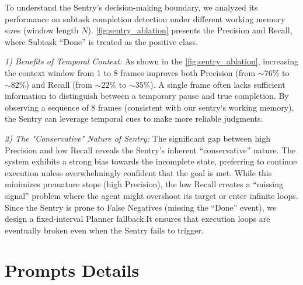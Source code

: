 To understand the Sentry's decision-making boundary, we analyzed its performance on subtask completion detection under different working memory sizes (window length $N$). \autoref{fig:sentry_ablation} presents the Precision and Recall, where Subtask ``Done'' is treated as the positive class.

\textit{1) Benefits of Temporal Context:}
As shown in the \autoref{fig:sentry_ablation}, increasing the context window from 1 to 8 frames improves both Precision (from $\sim76\%$ to $\sim82\%$) and Recall (from $\sim22\%$ to $\sim35\%$).
A single frame often lacks sufficient information to distinguish between a temporary pause and true completion.
By observing a sequence of 8 frames (consistent with our sentry‘s working memory), the Sentry can leverage temporal cues to make more reliable judgments.

\textit{2) The "Conservative" Nature of Sentry:}
The significant gap between high Precision and low Recall reveals the Sentry's inherent ``conservative'' nature.
The system exhibits a strong bias towards the incomplete state, preferring to continue execution unless overwhelmingly confident that the goal is met.
While this minimizes premature stops (high Precision), the low Recall creates a ``missing signal'' problem where the agent might overshoot its target or enter infinite loops.
Since the Sentry is prone to False Negatives (missing the ``Done'' event), we design a fixed-interval Planner fallback.It ensures that execution loops are eventually broken even when the Sentry fails to trigger.


\section{Prompts Details}

